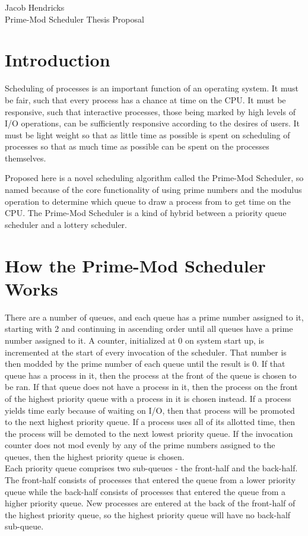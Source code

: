 \documentclass[12pt]{article}
\begin{document}
	
	\noindent Jacob Hendricks \\ Prime-Mod Scheduler Thesis Proposal
	
	\section*{Introduction}
	Scheduling of processes is an important function of an operating system.
	It must be fair, such that every process has a chance at time on the CPU.
	It must be responsive, such that interactive processes, those being marked by high levels of I/O operations, can be sufficiently responsive according to the desires of users.
	It must be light weight so that as little time as possible is spent on scheduling of processes so that as much time as possible can be spent on the processes themselves.
	
	Proposed here is a novel scheduling algorithm called the Prime-Mod Scheduler, so named because of the core functionality of using prime numbers and the modulus operation to determine which queue to draw a process from to get time on the CPU.
	The Prime-Mod Scheduler is a kind of hybrid between a priority queue scheduler and a lottery scheduler.
	
	\section*{How the Prime-Mod Scheduler Works}
	There are a number of queues, and each queue has a prime number assigned to it, starting with 2 and continuing in ascending order until all queues have a prime number assigned to it.
	A counter, initialized at 0 on system start up, is incremented at the start of every invocation of the scheduler. 
	That number is then modded by the prime number of each queue until the result is 0.
	If that queue has a process in it, then the process at the front of the queue is chosen to be ran.
	If that queue does not have a process in it, then the process on the front of the highest priority queue with a process in it is chosen instead.
	If a process yields time early because of waiting on I/O, then that process will be promoted to the next highest priority queue.
	If a process uses all of its allotted time, then the process will be demoted to the next lowest priority queue.
	If the invocation counter does not mod evenly by any of the prime numbers assigned to the queues, then the highest priority queue is chosen.\\
	
	
	Each priority queue comprises two sub-queues - the front-half and the back-half.
	The front-half consists of processes that entered the queue from a lower priority queue while the back-half consists of processes that entered the queue from a higher priority queue.
	New processes are entered at the back of the front-half of the highest priority queue, so the highest priority queue will have no back-half sub-queue. \\
	
\end{document}
